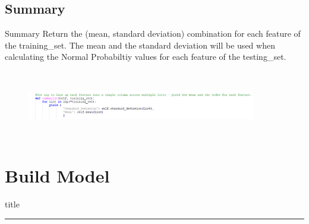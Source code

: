 \documentclass{beamer}
\begin{document}
\subsection{Summary}
    \begin{frame}{Summary}
        \hspace{0.5cm} Return the (mean, standard deviation) combination for each feature of the training\_set. The mean and the standard deviation will be used when calculating the Normal Probabiltiy values for each feature of the testing\_set.
        \begin{center}
            \begin{figure}
                \begin{center}
                    \includegraphics[width = 10cm, height = 3cm]{Theme/images/summary.PNG}
                \end{center}
            \end{figure}
        \end{center}
    \end{frame}

\section{Build Model}
    \begin{frame}[plain]
        \vfill
      \centering
      \begin{beamercolorbox}[sep=8pt,center,shadow=true,rounded=true]{title}
        \insertsectionhead\par%
        \color{oxfordblue}\noindent\rule{10cm}{1pt} \\
        \LARGE{\faFileTextO}
      \end{beamercolorbox}
      \vfill
  \end{frame}
  
\end{document}
